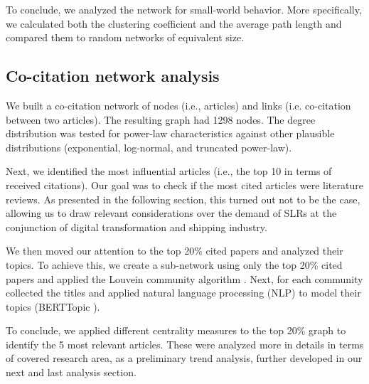 \documentclass[a4paper, review, endfloat, authoryear]{elsarticle}
\begin{document}
	To conclude, we analyzed the network for small-world behavior. More specifically, we calculated both the clustering coefficient and the average path length and compared them to random networks of equivalent size.
	
	\subsection{Co-citation network analysis}
	We built a co-citation network of nodes (i.e., articles) and links (i.e. co-citation between two articles). The resulting graph had 1298 nodes. The degree distribution was tested for power-law characteristics against other plausible distributions (exponential, log-normal, and truncated power-law).
	
	Next, we identified the most influential articles (i.e., the top 10 in terms of received citations). Our goal was to check if the most cited articles were literature reviews. As presented in the following section, this turned out not to be the case, allowing us to draw relevant considerations over the demand of SLRs at the conjunction of digital transformation and shipping industry.
	
	We then moved our attention to the top 20\% cited papers and analyzed their topics. To achieve this, we create a sub-network using only the top 20\% cited papers and applied the Louvein community algorithm \citep{blondel2008fast}. Next, for each community collected the titles and applied natural language processing (NLP) to model their topics (BERTTopic \citep{paulcombining}).
	
	To conclude, we applied different centrality measures to the top 20\% graph to identify the 5 most relevant articles. These were analyzed more in details in terms of covered research area, as a preliminary trend analysis, further developed in our next and last analysis section.
	
\end{document}
